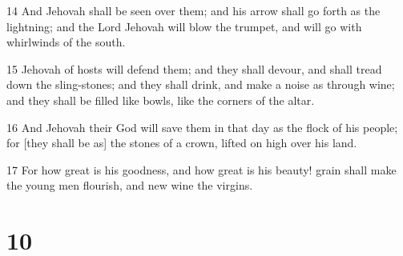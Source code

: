 \par 14 And Jehovah shall be seen over them; and his arrow shall go forth as the lightning; and the Lord Jehovah will blow the trumpet, and will go with whirlwinds of the south.
\par 15 Jehovah of hosts will defend them; and they shall devour, and shall tread down the sling-stones; and they shall drink, and make a noise as through wine; and they shall be filled like bowls, like the corners of the altar.
\par 16 And Jehovah their God will save them in that day as the flock of his people; for [they shall be as] the stones of a crown, lifted on high over his land.
\par 17 For how great is his goodness, and how great is his beauty! grain shall make the young men flourish, and new wine the virgins.

\chapter{10}

